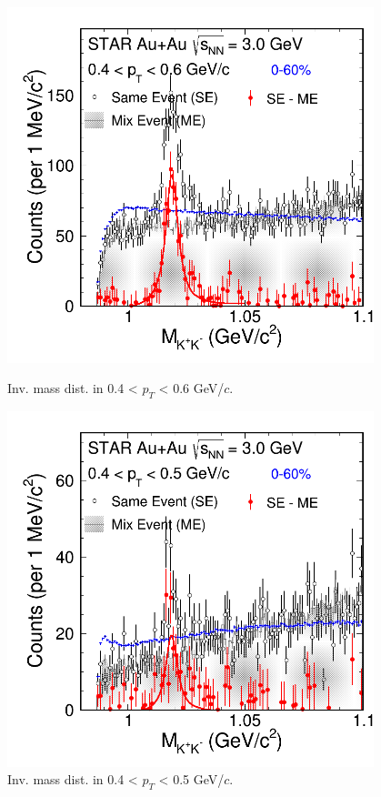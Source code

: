 \begin{figure}[htbp]
\begin{minipage}[htbp]{0.45\linewidth}
\centering
\includegraphics[width=0.95\textwidth]{chapterY/fig/fig1_signal_0_0.png}
\caption{Inv. mass dist. in 0.4 < $p_T$ < 0.6 GeV/$c$. \label{fig:mixedEvent_pT0}}
\end{minipage}
\hfill
\begin{minipage}[htbp]{0.45\linewidth}
\centering
\includegraphics[width=0.95\textwidth]{chapterY/fig/fig1_signal_0_1.png} 
\caption{Inv. mass dist. in 0.4 < $p_T$ < 0.5 GeV/$c$. \label{fig:mixedEvent_pT1}}
\end{minipage}
\end{figure}

